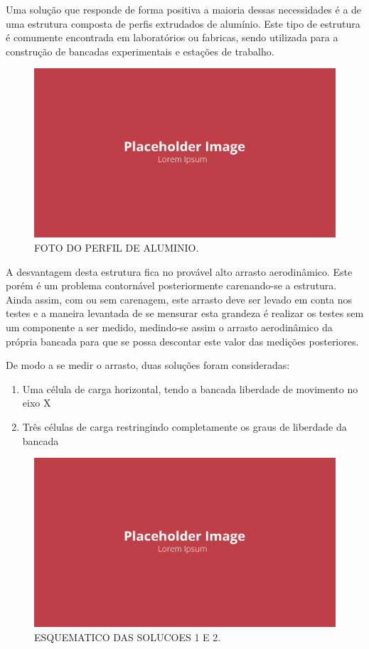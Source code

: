 Uma solução que responde de forma positiva a maioria dessas necessidades é a de uma estrutura composta de perfis extrudados de alumínio. Este tipo de estrutura é comumente encontrada em laboratórios ou fabricas, sendo utilizada para a construção de bancadas experimentais e estações de trabalho.

\begin{figure}[!ht]
    \centering
    \includegraphics[width=.8\linewidth]{figuras/placeholder.png}
    \caption{FOTO DO PERFIL DE ALUMINIO\cite{autor}.}
    \label{fig:placeholder}
\end{figure}

A desvantagem desta estrutura fica no provável alto arrasto aerodinâmico. Este porém é um problema contornável posteriormente carenando-se a estrutura. Ainda assim, com ou sem carenagem, este arrasto deve ser levado em conta nos testes e a maneira levantada de se mensurar esta grandeza é realizar os testes sem um componente a ser medido, medindo-se assim o arrasto aerodinâmico da própria bancada para que se possa descontar este valor das medições posteriores.

De modo a se medir o arrasto, duas soluções foram consideradas: 

\begin{enumerate}
    \item Uma célula de carga horizontal, tendo a bancada liberdade de movimento no eixo X
    \item Três células de carga restringindo completamente os graus de liberdade da bancada
\end{enumerate}

\begin{figure}[!ht]
    \centering
    \includegraphics[width=.8\linewidth]{figuras/placeholder.png}
    \caption{ESQUEMATICO DAS SOLUCOES 1 E 2\cite{autor}.}
    \label{fig:placeholder}
\end{figure}

